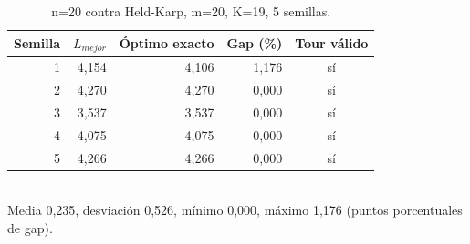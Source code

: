\begin{table}[H]\centering
\caption{n=20 contra Held-Karp, m=20, K=19, 5 semillas.}
\label{tab:n20}
\begin{tabular}{rrrrc}\toprule
\rowcolor{gray!25}
\textbf{Semilla} & \textbf{$L_{mejor}$} & \textbf{Óptimo exacto} & \textbf{Gap (\%)} & \textbf{Tour válido} \\\midrule
1 & 4,154 & 4,106 & 1,176 & sí \\
2 & 4,270 & 4,270 & 0,000 & sí \\
3 & 3,537 & 3,537 & 0,000 & sí \\
4 & 4,075 & 4,075 & 0,000 & sí \\
5 & 4,266 & 4,266 & 0,000 & sí \\
\bottomrule\end{tabular}\\[0.3em]
{\footnotesize Media 0,235, desviación 0,526, mínimo 0,000, máximo 1,176 (puntos porcentuales de gap).}
\end{table}
